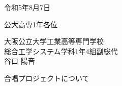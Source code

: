 
\begin{flushright}
    令和5年8月7日
\end{flushright}
\begin{flushleft}
    公大高専1年各位
\end{flushleft}
\begin{flushright}
    大阪公立大学工業高等専門学校\\
    総合工学システム学科1年4組副総代\\
    谷口 陽音\\
\end{flushright}
\begin{center}
    合唱プロジェクトについて
\end{center}
